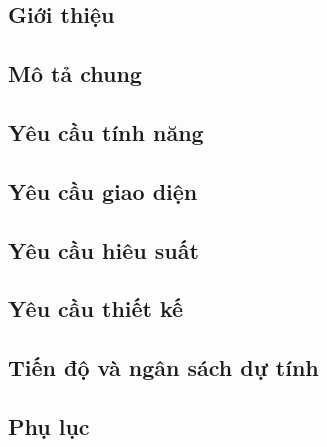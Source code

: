 \subsection{Giới thiệu}
\subsection{Mô tả chung}
\subsection{Yêu cầu tính năng}
\subsection{Yêu cầu giao diện}
\subsection{Yêu cầu hiêu suất}
\subsection{Yêu cầu thiết kế}
\subsection{Tiến độ và ngân sách dự tính}
\subsection{Phụ lục}